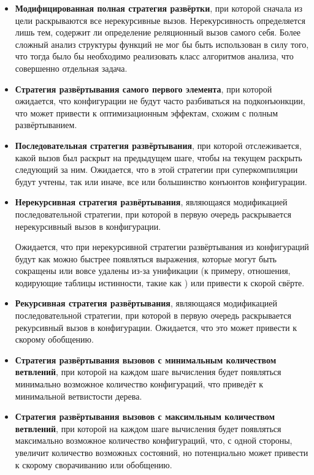 \begin{itemize}
\item {\bf Модифицированная полная стратегия развёртки}, при которой сначала из цели
      раскрываются все нерекурсивные вызов.
      Нерекурсивность определяется
      лишь тем, содержит ли определение реляционный вызов самого себя. Более сложный
      анализ структуры функций не мог бы быть использован в силу того, что тогда
      было бы необходимо реализовать класс алгоритмов анализа, что совершенно отдельная задача.

\item {\bf Стратегия развёртывания самого первого элемента}, при которой ожидается,
      что конфигурации не будут часто разбиваться на подконъюнкции, что может
      привести к оптимизационным эффектам, схожим с полным развёртыванием.

\item {\bf Последовательная стратегия развёртывания}, при которой отслеживается,
      какой вызов был раскрыт на предыдущем шаге, чтобы на текущем
      раскрыть следующий за ним. Ожидается, что в этой стратегии
      при суперкомпиляции будут учтены, так или иначе, все или большинство конъюнтов
      конфигурации.

\item {\bf Нерекурсивная стратегия развёртывания}, являющаяся модификацией
      последовательной стратегии, при которой в первую очередь
      раскрывается нерекурсивный вызов в конфигурации.

      Ожидается, что при нерекурсивной стратегии развёртывания из конфигураций
      будут как можно быстрее появляться выражения, которые могут быть сокращены
      или вовсе удалены из-за унификации (к примеру, отношения, кодирующие
      таблицы истинности, такие как ) или привести к скорой свёрте.

\item {\bf Рекурсивная стратегия развёртывания}, являющаяся модификацией
      последовательной стратегии,  при которой в первую очередь
      раскрывается рекурсивный вызов в конфигурации. Ожидается, что это
      может привести к скорому обобщению.

\item {\bf Стратегия развёртывания вызовов с минимальным количеством ветвлений},
      при которой на каждом шаге вычисления будет появляться минимально возможное количество
      конфигураций, что приведёт к минимальной ветвистости дерева.

\item {\bf Стратегия развёртывания вызовов с максимльным количеством ветвлений},
      при которой на каждом шаге вычисления будет появляться максимально возможное количество
      конфигураций, что, с одной стороны, увеличит количество возможных состояний, но
      потенциально может привести к скорому сворачиванию или обобщению.

\end{itemize}

